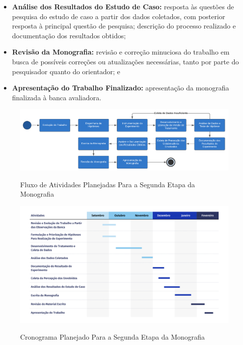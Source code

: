\begin{itemize}
    \item \textbf{Análise dos Resultados do Estudo de Caso:} resposta às questões de pesquisa do estudo de caso a partir dos dados coletados, com posterior resposta à principal questão de pesquisa; descrição do processo realizado e documentação dos resultados obtidos;
    \item \textbf{Revisão da Monografia:} revisão e correção minuciosa do trabalho em busca de possíveis correções ou atualizações necessárias, tanto por parte do pesquisador quanto do orientador; e
    \item \textbf{Apresentação do Trabalho Finalizado:} apresentação da monografia finalizada à banca avaliadora.
\end{itemize}

\begin{figure}
    \caption{Fluxo de Atividades Planejadas Para a Segunda Etapa da Monografia}
    \centering
    \includegraphics[width=1\linewidth]{figuras/atividades2.png}
    \label{fig:atividades_2}
\end{figure}
\begin{figure}
    \caption{Cronograma Planejado Para a Segunda Etapa da Monografia}
    \centering
    \includegraphics[width=1\linewidth]{figuras/cronograma2.png}
    \label{fig:cronograma_2}
\end{figure}

